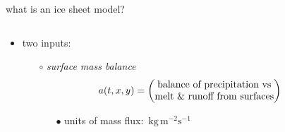 \documentclass[svgnames,
               hyperref={colorlinks,citecolor=DeepPink4,linkcolor=FireBrick,urlcolor=Maroon},
               usepdftitle=false]  %
               {beamer}
\begin{document}
\begin{frame}{what is an ice sheet model?}

\begin{columns}
\begin{column}{0.6\textwidth}
\begin{itemize}
\begin{definition}
an \alert{ice sheet model} is a \underline{map} which simulates an ice sheet in a climate
\end{definition} 
\item two inputs:
    \begin{itemize}
    \item[$\circ$] \emph{surface mass balance}
$$\hspace{-7mm} a(t,x,y) = \begin{pmatrix}
\text{balance of precipitation vs} \\
\text{melt \& runoff from surfaces}
\end{pmatrix}$$

\vspace{-3mm}
        \begin{itemize}
        \item[{\scriptsize $\bullet$}] units of mass flux:\, $\text{kg}\, \text{m}^{-2} \text{s}^{-1}$
        \end{itemize}


\end{itemize}
\end{itemize}
\end{column}
\end{columns}
\end{frame}
\end{document}
